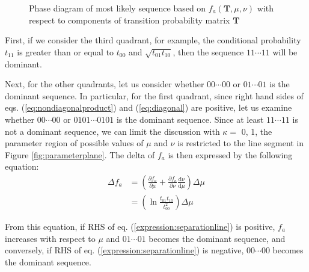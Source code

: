﻿\documentclass[a4paper,xelatex,english]{bxjsarticle}
\newcommand\mib[1]{\boldsymbol{#1}}
\begin{document}
\begin{figure}[htbp]
\centering


\caption{Phase diagram of most likely sequence based on $f_{a}(\mib{T}, \mu, \nu)$ with respect to components of transition probability matrix $\mib{T}$}
\label{fig:phasediagram}
\end{figure}

First, if we consider the third quadrant, for example, the conditional probability $t_{11}$ is greater than or equal to $t_{00}$ and $\sqrt{t_{01}t_{10}}$, then the sequence $11 \cdots 11$ will be dominant.

Next, for the other quadrants, let us consider whether $00 \cdots 00$ or $01 \cdots 01$ is the dominant sequence. 
In particular, for the first quadrant, since right hand sides of eqs. (\ref{eq:nondiagonalproduct}) and (\ref{eq:diagonal}) are positive, let us examine whether $00 \cdots 00$ or $0101 \cdots 0101$ is the dominant sequence. 
Since at least $11 \cdots 11$ is not a dominant sequence, we can limit the discussion with $\kappa =$ 0, 1, the parameter region of possible values of $\mu$ and $\nu$ is restricted to the line segment in Figure \ref{fig:parameterplane}. 
The delta of $f_{a}$ is then expressed by the following equation:
\begin{align}
\Delta f_{a} 
&= 
\left( 
\frac{\partial f_{a}}{\partial \mu} 
+ 
\frac{\partial f_{a}}{\partial \nu} 
\frac{{\mathrm d} \nu}{{\mathrm d} \mu}
\right) 
\Delta \mu 
\nonumber 
\\
&= 
\left(
\ln \frac{t_{01}t_{10}}{t_{00}^{2}}
\right)
\Delta \mu
\end{align}

From this equation, if RHS of eq. (\ref{expression:separationline}) is positive, $f_{a}$ increases with respect to $\mu$ and $01 \cdots 01$ becomes the dominant sequence, and conversely, if RHS of eq. (\ref{expression:separationline}) is negative, $00 \cdots 00$ becomes the dominant sequence.
\end{document}
